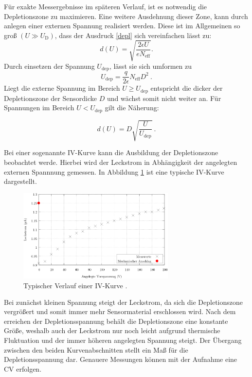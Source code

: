 Für exakte Messergebnisse im späteren Verlauf, ist es notwendig die Depletionszone zu maximieren. Eine weitere Ausdehnung dieser Zone, kann durch anlegen einer externen Spannung realisiert werden. Diese ist im Allgemeinen so groß $(U\gg U_\text{D})$, dass der Ausdruck \eqref{depl}
sich vereinfachen lässt zu:
\begin{equation}
    \label{dicke}
    d(U)=\sqrt{ \frac{ 2 \epsilon U }{e N_\text{eff}}}.
\end{equation}
Durch einsetzen der Spannung $U_\text{dep}$, lässt sie sich umformen zu
\begin{equation}
    U_\text{dep}=\frac{q}{2 \epsilon} N_\text{eff}D^2 \:.
\end{equation}
Liegt die externe Spannung im Bereich $ U\geq U_\text{dep}$ entspricht die dicker der Depletionszone der Sensordicke $D$ und wächst somit nicht weiter an.
Für Spannungen im Bereich $U<U_\text{dep}$ gilt die Näherung:

\begin{equation}
    \label{depsu}
d(U)=D\sqrt{\frac{U}{U_\text{dep}}}\:.
\end{equation}

Bei einer sogenannte IV-Kurve kann die Ausbildung der Depletionszone beobachtet werde. Hierbei wird der Leckstrom in Abhängigkeit der angelegten externen Spannnung gemessen. In Abbildung \ref{IVKurve} ist eine typische IV-Kurve dargestellt.

\begin{figure}[H]
  \centering
  \includegraphics[width=0.7\textwidth]{ressources/IV.png}
  \caption{Typischer Verlauf einer IV-Kurve \cite{skript}.}
  \label{IVKurve}
\end{figure}

Bei zunächst kleinen Spannung steigt der Leckstrom, da sich die Depletionszone vergrößert und somit immer mehr Sensormaterial erschlossen wird. Nach dem erreichen der Depletionsspannung behält die Depletionszone eine konstante Größe, weshalb auch der Leckstrom nur noch leicht aufgrund thermische Fluktuation und der immer höheren angelegten Spannung steigt. Der Übergang zwischen den beiden Kurvenabschnitten stellt ein Maß für die Depletionsspannung dar. Genauere Messungen können mit der Aufnahme eine CV erfolgen.  

